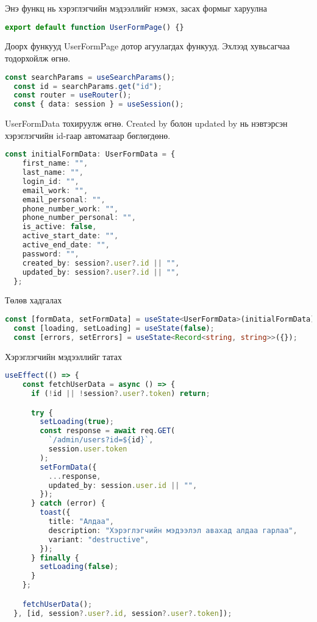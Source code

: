 Энэ функц нь хэрэглэгчийн мэдээллийг нэмэх, засах формыг харуулна
\begin{lstlisting}[language=Typescript, caption=UserFormPage функц (Main component), frame=single]
export default function UserFormPage() {}
\end{lstlisting}

Доорх функууд UserFormPage дотор агуулагдах функууд. Эхлээд хувьсагчаа тодорхойлж өгнө.
\begin{lstlisting}[language=Typescript, caption=Хувьсагч, frame=single]
	const searchParams = useSearchParams();
  const id = searchParams.get("id");
  const router = useRouter();
  const { data: session } = useSession();
\end{lstlisting}

UserFormData тохируулж өгнө. Created by болон updated by нь нэвтэрсэн хэрэглэгчийн id-гаар автоматаар бөглөгдөнө.

\begin{lstlisting}[language=Typescript, caption=initialFormData хоосон утга оноосон байдал, frame=single]
	const initialFormData: UserFormData = {
    first_name: "",
    last_name: "",
    login_id: "",
    email_work: "",
    email_personal: "",
    phone_number_work: "",
    phone_number_personal: "",
    is_active: false,
    active_start_date: "",
    active_end_date: "",
    password: "",
    created_by: session?.user?.id || "",
    updated_by: session?.user?.id || "",
  };
\end{lstlisting}

Төлөв хадгалах
\begin{lstlisting}[language=Typescript, caption=Төлөв хадгалах, frame=single]
	const [formData, setFormData] = useState<UserFormData>(initialFormData);
  const [loading, setLoading] = useState(false);
  const [errors, setErrors] = useState<Record<string, string>>({});
\end{lstlisting}


Хэрэглэгчийн мэдээллийг татах
\begin{lstlisting}[language=Typescript, caption=Хэрэглэгчийн мэдээлэл татах useEffect, frame=single]
	useEffect(() => {
    const fetchUserData = async () => {
      if (!id || !session?.user?.token) return;

      try {
        setLoading(true);
        const response = await req.GET(
          `/admin/users?id=${id}`,
          session.user.token
        );
        setFormData({
          ...response,
          updated_by: session.user.id || "",
        });
      } catch (error) {
        toast({
          title: "Алдаа",
          description: "Хэрэглэгчийн мэдээлэл авахад алдаа гарлаа",
          variant: "destructive",
        });
      } finally {
        setLoading(false);
      }
    };

    fetchUserData();
  }, [id, session?.user?.id, session?.user?.token]);
\end{lstlisting}

